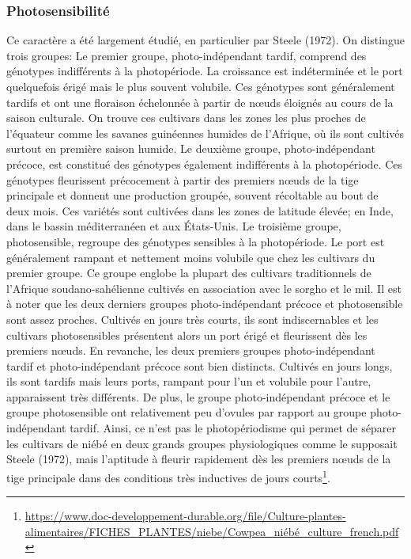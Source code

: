 \documentclass[a4paper,11pt]{article}
\begin{document}
\subsubsection{Photosensibilité}

Ce caractère a été largement étudié, en particulier par Steele
(1972). On distingue trois groupes: Le premier groupe,
photo-indépendant tardif, comprend des génotypes indifférents à la
photopériode. La croissance est indéterminée et le port quelquefois
érigé mais le plus souvent volubile. Ces génotypes sont généralement
tardifs et ont une floraison échelonnée à partir de nœuds éloignés au
cours de la saison culturale. On trouve ces cultivars dans les zones
les plus proches de l’équateur comme les savanes guinéennes humides de
l’Afrique, où ils sont cultivés surtout en première saison humide.  Le
deuxième groupe, photo-indépendant précoce, est constitué des
génotypes également indifférents à la photopériode. Ces génotypes
fleurissent précocement à partir des premiers nœuds de la tige
principale et donnent une production groupée, souvent récoltable au
bout de deux mois. Ces variétés sont cultivées dans les zones de
latitude élevée; en Inde, dans le bassin méditerranéen et aux
États-Unis.  Le troisième groupe, photosensible, regroupe des
génotypes sensibles à la photopériode. Le port est généralement
rampant et nettement moins volubile que chez les cultivars du premier
groupe. Ce groupe englobe la plupart des cultivars traditionnels de
l’Afrique soudano-sahélienne cultivés en association avec le sorgho et
le mil\cite{Doggett_1988}. Il est à noter que les deux derniers groupes
photo-indépendant précoce et photosensible sont assez
proches. Cultivés en jours très courts, ils sont indiscernables et les
cultivars photosensibles présentent alors un port érigé et fleurissent
dès les premiers nœuds. En revanche, les deux premiers groupes
photo-indépendant tardif et photo-indépendant précoce sont bien
distincts. Cultivés en jours longs, ils sont tardifs mais leurs ports,
rampant pour l’un et volubile pour l’autre, apparaissent très
différents. De plus, le groupe photo-indépendant précoce et le groupe
photosensible ont relativement peu d’ovules par rapport au groupe
photo-indépendant tardif. Ainsi, ce n’est pas le photopériodisme qui
permet de séparer les cultivars de niébé en deux grands groupes
physiologiques comme le supposait Steele (1972), mais l’aptitude à
fleurir rapidement dès les premiers nœuds de la tige principale dans
des conditions très inductives de jours courts\footnote{\url{https://www.doc-developpement-durable.org/file/Culture-plantes-alimentaires/FICHES_PLANTES/niebe/Cowpea_niébé_culture_french.pdf}}.
\end{document}
